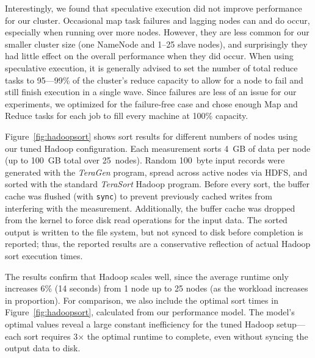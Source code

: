 Interestingly, we found that speculative execution did not improve
performance for our cluster.
Occasional map task failures and lagging nodes can
and do occur, especially when running over more nodes.
However, they are less common for our smaller cluster size
(one NameNode and 1--25 slave nodes), and surprisingly they
had little effect on the overall performance when they did occur.
When using speculative execution, it is generally
advised to set the number of total reduce tasks to 95---99\% of the
cluster's reduce capacity to allow for a node to fail and still
finish execution in a single wave.  Since failures are less of an
issue for our experiments, we optimized for the failure-free case and
chose enough Map and Reduce tasks for each job to fill every machine
at 100\% capacity.



\label{sec:hadoop:results}
Figure~\ref{fig:hadoopsort} shows sort results for different numbers
of nodes using our tuned Hadoop configuration.  Each measurement sorts
4~GB of data per node (up to 100~GB total over 25~nodes).  Random
100~byte input records were generated with the \emph{TeraGen} program,
spread across active nodes via HDFS, and sorted with the standard
\emph{TeraSort} Hadoop program.  Before every sort, the buffer cache
was flushed (with \texttt{sync}) to prevent previously cached writes
from interfering with the measurement.  Additionally, the buffer cache
was dropped from the kernel to force disk read operations for the
input data.  The sorted output is written to the file system, but not
synced to disk before completion is reported; thus, the reported
results are a conservative reflection of actual Hadoop sort execution
times.



The results confirm that Hadoop scales well, since the average runtime
only increases 6\% (14 seconds) from 1 node up to 25 nodes (as the workload
increases in proportion).
For comparison, we also include the optimal sort times in
Figure~\ref{fig:hadoopsort}, calculated from our performance model.
The model's optimal values reveal a large constant inefficiency
for the tuned Hadoop setup---each sort requires 3$\times$ the optimal
runtime to complete, even without syncing the output data to disk.

